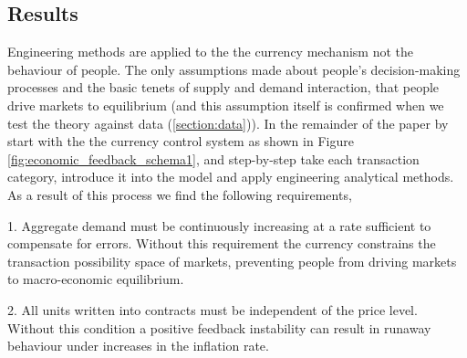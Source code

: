 \subsection{Results}

%



Engineering methods are applied to the the currency mechanism not the behaviour of people. The only
assumptions made about people's decision-making processes and the basic tenets of supply and demand
interaction, that people drive markets to equilibrium (and this assumption itself is confirmed when
we test the theory against data (\ref{section:data})). In the remainder of the paper by start with
the the currency control system as shown in Figure \ref{fig:economic_feedback_schema1}, and
step-by-step take each transaction category, introduce it into the model and apply engineering
analytical methods. As a result of this process we find the following requirements, 

1. Aggregate demand must be continuously increasing at a rate sufficient to compensate for errors.
Without this requirement the currency constrains the transaction possibility space of markets,
preventing people from driving markets to macro-economic equilibrium.

2. All units written into contracts must be independent of the price level. Without this condition a
positive feedback instability can result in runaway behaviour under increases in the inflation rate.

